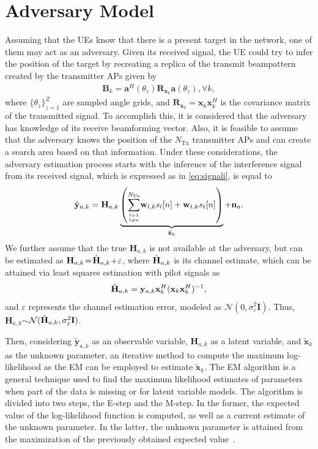 \documentclass[conference,twocolumn,a4paper]{IEEEtran}
\theoremstyle{remark} \newtheorem{remark}{Remark}
\begin{document}
\section{Adversary Model}
Assuming that the UEs know that there is a present target in the network, one of them may act as an adversary. Given its received signal, the UE could try to infer the position of the target by recreating a replica of the transmit beampattern created by the transmitter APs given by
\begin{align}\label{eq:beampat}
    \mathbf{B}_k = \mathbf{a}^H(\theta_{z})\mathbf{R}_{\mathbf{x}_k}\mathbf{a}(\theta_{z}), \forall k,
\end{align}
where $\{\theta_z\}^{Z}_{z=1}$ are sampled angle grids, and $\mathbf{R}_{\mathbf{x}_k}$$=$$\mathbf{x}_k\mathbf{x}_k^H$ is the covariance matrix of the transmitted signal. To accomplish this, it is considered that the adversary has knowledge of its receive beamforming vector. Also, it is feasible to assume that the adversary knows the position of the $N_{\mathrm{Tx}}$ transmitter APs and can create a search area based on that information. Under these considerations, the adversary estimation process starts with the inference of the interference signal from its received signal, which is expressed as in \eqref{eq:signali}, is equal to
\begin{align}
     \tilde{\mathbf{y}}_{a,k} = \mathbf{H}_{a,k}\underbrace{\left(\sum_{l=1 \atop l \neq a}^{N_{\mathrm{Ue}}}\!\mathbf{w}_{l,k}s_l[n]+\mathbf{w}_{t,k}s_t[n]\right)}_{\tilde{\mathbf{x}}_k}+\mathbf{n}_a.
 \end{align}
 We further assume that the true $\mathbf{H}_{a,k}$ is not available at the adversary, but can be estimated as $\mathbf{H}_{a,k}\!=\!\Hat{\mathbf{H}}_{a,k}\!+\!\varepsilon$, where $\Hat{\mathbf{H}}_{a,k}$ is its channel estimate, which can be attained via least squares estimation with pilot signals as
\begin{align}
    \Hat{\mathbf{H}}_{a,k} = \mathbf{y}_{a,k}\mathbf{x}_k^H(\mathbf{x}_k\mathbf{x}_k^H)^{-1},
\end{align}
and $\varepsilon$ represents the channel estimation error, modeled as $\mathcal{N}(0,\sigma_\varepsilon^2 \mathbf{I})$. Thus, $\mathbf{H}_{a,k}$$\sim$$\mathcal{N}(\Hat{\mathbf{H}}_{a,k},\sigma_\varepsilon^2 \mathbf{I})$.

Then, considering  $\tilde{\mathbf{y}}_{a,k}$ as an observable variable, $\mathbf{H}_{a,k}$ as a latent variable, and   $\tilde{\mathbf{x}}_k$ as the unknown parameter, an iterative method to compute the maximum log-likelihood as the EM can be employed to estimate $\tilde{\mathbf{x}}_k$. The EM algorithm is a general technique used to find the maximum likelihood estimates of parameters when part of the data is missing or for latent variable models. The algorithm is divided into two steps, the E-step and the M-step. In the former, the expected value of the log-likelihood function is computed, as well as a current estimate of the unknown parameter. In the latter, the unknown parameter is attained from the maximization of the previously obtained expected value~\cite{art:em}.
\end{document}
